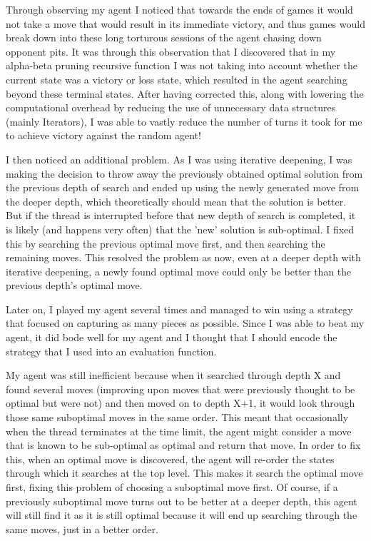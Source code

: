 \documentclass{article}
\begin{document}
Through observing my agent I noticed that towards the ends of games it would not take a move that would result in its immediate victory, and thus
games would break down into these long torturous sessions of the agent chasing down opponent pits. It was through this observation that
I discovered that in my alpha-beta pruning recursive function I was not taking into account whether the current state was a victory or loss state,
which resulted in the agent searching beyond these terminal states. After having corrected this, along with lowering the computational overhead by reducing
the use of unnecessary data structures (mainly Iterators), I was able to vastly reduce the number of turns it took for me to achieve victory against 
the random agent!

I then noticed an additional problem. As I was using iterative deepening, I was making the decision to throw away the previously obtained optimal solution from the
previous depth of search and ended up using the newly generated move from the deeper depth, which theoretically should mean that the solution is better. But if the thread
is interrupted before that new depth of search is completed, it is likely (and happens very often) that the 'new' solution is sub-optimal. I fixed this by searching the previous
optimal move first, and then searching the remaining moves. This resolved the problem as now, even at a deeper depth with iterative deepening, a newly found optimal move
could only be better than the previous depth's optimal move.

Later on, I played my agent several times and managed to win using a strategy that focused on capturing as many pieces as possible. Since I was able to beat my agent, it
did bode well for my agent and I thought that I should encode the strategy that I used into an evaluation function.

My agent was still inefficient because when it searched through depth X and found several moves (improving upon moves that were previously thought to be optimal but were not)
and then moved on to depth X+1, it would look through those same suboptimal moves in the same order. This meant that occasionally when the thread terminates at the time
limit, the agent might consider a move that is known to be sub-optimal as optimal and return that move. In order to fix this, when an optimal move is discovered, the agent
will re-order the states through which it searches at the top level. This makes it search the optimal move first, fixing this problem of choosing a suboptimal move first.
Of course, if a previously suboptimal move turns out to be better at a deeper depth, this agent will still find it as it is still optimal because it will end up searching
through the same moves, just in a better order.
\end{document}
